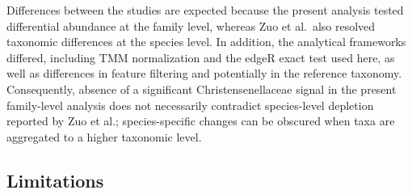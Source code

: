 \documentclass[
  letterpaper,
  DIV=11,
  numbers=noendperiod]{scrartcl}
\begin{document}
Differences between the studies are expected because the present
analysis tested differential abundance at the family level, whereas Zuo
et al.~also resolved taxonomic differences at the species level. In
addition, the analytical frameworks differed, including TMM
normalization and the edgeR exact test used here, as well as differences
in feature filtering and potentially in the reference taxonomy.
Consequently, absence of a significant Christensenellaceae signal in the
present family-level analysis does not necessarily contradict
species-level depletion reported by Zuo et al.; species-specific changes
can be obscured when taxa are aggregated to a higher taxonomic level.

\subsection{Limitations}\label{limitations}
\end{document}
